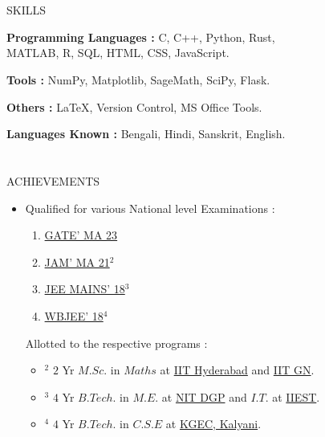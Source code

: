\documentclass{my_cv}
\begin{document}
\begin{multicols}{2}
\section{\faPaintBrush}{SKILLS}

\textbf{Programming Languages :} C, C++, Python, Rust, \\ MATLAB, R, SQL, HTML, CSS, JavaScript.

\noindent\textbf{Tools :} NumPy, Matplotlib, SageMath, SciPy, Flask.

\noindent\textbf{Others :} \LaTeX, Version Control, MS Office Tools.

\noindent\textbf{Languages Known :} Bengali, Hindi, Sanskrit, English.

\vspace{-4pt}

\section{\faStar}{ACHIEVEMENTS}
\begin{itemize}
\item Qualified for various National level Examinations : \vspace{-10pt}
\begin{multicols}{2}
\begin{enumerate}
    \item \href{https://gate.iitk.ac.in/}{GATE' MA 23}
    \item \href{https://iisc.ac.in/events/jam-online-admission-portal-system-joaps/}{JAM' MA 21$^2$}
    \item \href{https://jeemain.nta.ac.in/}{JEE MAINS' 18$^3$}
    \item \href{https://wbjeeb.nic.in/}{WBJEE' 18$^4$}
\end{enumerate}
\end{multicols}
\vspace{-10pt}
Allotted to the respective programs :
\begin{itemize}
    \item $^2$ $2$ Yr $M.Sc.$ in $Maths$ at \href{https://math.iith.ac.in/}{IIT Hyderabad} and \href{https://math.iitgn.ac.in/}{IIT GN}.
    \item $^3$ $4$ Yr $B.Tech.$ in $M.E.$ at \href{https://nitdgp.ac.in/department/mechanical-engineering}{NIT DGP} and $I.T.$ at \href{https://www.iiests.ac.in/IIEST/AcaUnitDetails/IT}{IIEST}.
    \item $^4$ $4$ Yr $B.Tech.$ in $C.S.E$ at \href{https://www.kgec.edu.in/department?name=cse}{KGEC, Kalyani}.

\end{itemize}
\end{itemize}
\end{multicols}
\end{document}
